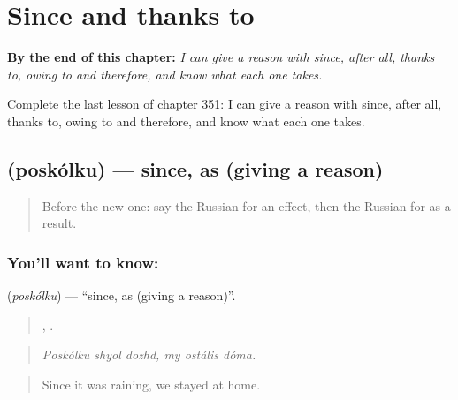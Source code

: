 
\chapter{Since and thanks to}
\label{ch:ru-since-and-thanks-to}

\begin{chapteropening}
\textbf{By the end of this chapter:} \emph{I can give a reason with since, after all, thanks to, owing to and therefore, and know what each one takes.}

Complete the last lesson of chapter 351: I can give a reason with since, after all, thanks to, owing to and therefore, and know what each one takes.
\end{chapteropening}

\section[\texorpdfstring{\ru{поскольку} (poskólku)}{поскольку (poskólku)}]{ (poskólku) — since, as (giving a reason)}

\label{lesson:RU-C351-poskolku}



\begin{quote}
Before the new one: say the Russian for an effect, then the Russian for as a result.
\end{quote}

\subsection*{You'll want to know: }
\textbf{} (\emph{poskólku}) — \textquotedblleft{}since, as (giving a reason)\textquotedblright{}.

\begin{quote}
  ,   .
\end{quote}

\begin{quote}
\emph{Poskólku shyol dozhd, my ostális dóma.}
\end{quote}

\begin{quote}
Since it was raining, we stayed at home.
\end{quote}

